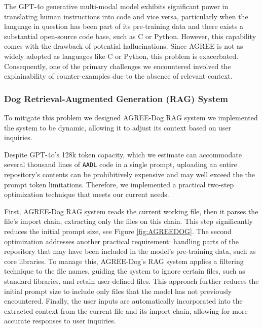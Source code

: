 The GPT-4o generative multi-modal model exhibits significant power in translating human instructions into code and vice versa, particularly when the language in question has been part of its pre-training data and there exists a substantial open-source code base, such as C or Python. However, this capability comes with the drawback of potential hallucinations. Since AGREE is not as widely adopted as languages like C or Python, this problem is exacerbated. Consequently, one of the primary challenges we encountered involved the explainability of counter-examples due to the absence of relevant context.
\subsubsection{Dog Retrieval-Augmented Generation (RAG) System}

 To mitigate this problem we designed AGREE-Dog RAG system we implemented the system to be dynamic, allowing it to adjust its context based on user inquiries. 

Despite GPT-4o's 128k token capacity, which we estimate can accommodate several thousand lines of \texttt{AADL} code in a single prompt, uploading an entire repository's contents can be prohibitively expensive and may well exceed the the prompt token limitations. Therefore, we implemented a practical two-step optimization technique that meets our current needs.

First, AGREE-Dog RAG system reads the current working file, then it parses the file's import chain, extracting only the files on this chain. This step significantly reduces the initial prompt size, see Figure \ref{fig:AGREEDOG}.  
%
The second optimization addresses another practical requirement: handling parts of the repository that may have been included in the model's pre-training data, such as core libraries. To manage this, AGREE-Dog's RAG system applies a filtering technique to the file names, guiding the system to ignore certain files, such as standard libraries, and retain user-defined files. This approach further reduces the initial prompt size to include only files that the model has not previously encountered. Finally, the user inputs are automatically incorporated into the extracted context from the current file and its import chain, allowing for more accurate responses to user inquiries.


